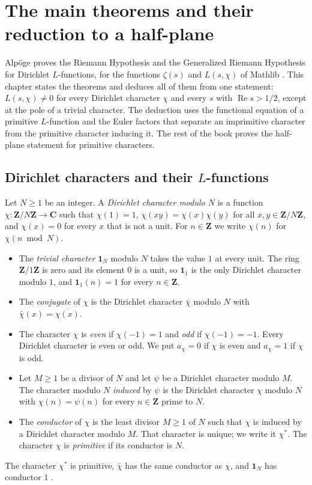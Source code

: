 \chapter{The main theorems and their reduction to a half-plane}\label{chapter-main-theorems}

Alpöge proves the Riemann Hypothesis and the Generalized Riemann Hypothesis for Dirichlet
$L$-functions, for the functions $\zeta(s)$ and $L(s,\chi)$ of Mathlib \cite{Mat20}. This chapter
states the theorems and deduces all of them from one statement: $L(s,\chi)\neq0$ for every
Dirichlet character $\chi$ and every $s$ with $\operatorname{Re}s>1/2$, except at the pole of a
trivial character. The deduction uses the functional equation of a primitive $L$-function and the
Euler factors that separate an imprimitive character from the primitive character inducing it. The
rest of the book proves the half-plane statement for primitive characters.

\section{Dirichlet characters and their $L$-functions}\label{section-mt-l-functions}

\begin{definition}\label{mt-dirichlet-character}
Let $N\geq1$ be an integer. A \emph{Dirichlet character modulo $N$} is a function
$\chi:\mathbf Z/N\mathbf Z\to\mathbf C$ such that $\chi(1)=1$, $\chi(xy)=\chi(x)\chi(y)$ for all
$x,y\in\mathbf Z/N\mathbf Z$, and $\chi(x)=0$ for every $x$ that is not a unit. For $n\in\mathbf Z$
we write $\chi(n)$ for $\chi(n\bmod N)$.
\begin{itemize}
\item The \emph{trivial character} $\mathbf 1_N$ modulo $N$ takes the value $1$ at every unit. The
  ring $\mathbf Z/1\mathbf Z$ is zero and its element $0$ is a unit, so $\mathbf 1_1$ is the only
  Dirichlet character modulo $1$, and $\mathbf 1_1(n)=1$ for every $n\in\mathbf Z$.
\item The \emph{conjugate} of $\chi$ is the Dirichlet character $\bar\chi$ modulo $N$ with
  $\bar\chi(x)=\overline{\chi(x)}$.
\item The character $\chi$ is \emph{even} if $\chi(-1)=1$ and \emph{odd} if $\chi(-1)=-1$. Every
  Dirichlet character is even or odd. We put $a_\chi=0$ if $\chi$ is even and $a_\chi=1$ if $\chi$
  is odd.
\item Let $M\geq1$ be a divisor of $N$ and let $\psi$ be a Dirichlet character modulo $M$. The
  character modulo $N$ \emph{induced} by $\psi$ is the Dirichlet character $\chi$ modulo $N$ with
  $\chi(n)=\psi(n)$ for every $n\in\mathbf Z$ prime to $N$.
\item The \emph{conductor} of $\chi$ is the least divisor $M\geq1$ of $N$ such that $\chi$ is
  induced by a Dirichlet character modulo $M$. That character is unique; we write it $\chi^*$. The
  character $\chi$ is \emph{primitive} if its conductor is $N$.
\end{itemize}
The character $\chi^*$ is primitive, $\bar\chi$ has the same conductor as $\chi$, and
$\mathbf 1_N$ has conductor $1$ \cite[Chapter 5]{Dav00}.
\end{definition}

